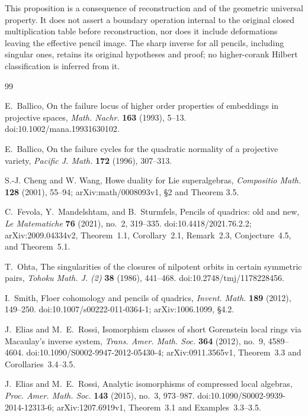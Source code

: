 \documentclass[11pt,reqno]{amsart}
\numberwithin{equation}{section}
\theoremstyle{definition}\newtheorem{definition}[theorem]{Definition}
\theoremstyle{remark}\newtheorem{remark}[theorem]{Remark}
\begin{document}
This proposition is a consequence of reconstruction and of the
geometric universal property. It does not assert a boundary
operation internal to the original closed multiplication table
before reconstruction, nor does it include deformations leaving
the effective pencil image. The sharp inverse for all pencils,
including singular ones, retains its original hypotheses and proof;
no higher-corank Hilbert classification is inferred from it.

\begin{thebibliography}{99}

E.~Ballico,
On the failure locus of higher order properties of embeddings in
projective spaces,
\emph{Math. Nachr.} \textbf{163} (1993), 5--13.
doi:10.1002/mana.19931630102.

E.~Ballico,
On the failure cycles for the quadratic normality of a projective
variety,
\emph{Pacific J. Math.} \textbf{172} (1996), 307--313.

S.-J. Cheng and W. Wang, Howe duality for Lie superalgebras,
\emph{Compositio Math.} \textbf{128} (2001), 55--94;
arXiv:math/0008093v1, \S2 and Theorem 3.5.

C.~Fevola, Y.~Mandelshtam, and B.~Sturmfels,
Pencils of quadrics: old and new,
\emph{Le Matematiche} \textbf{76} (2021), no.~2, 319--335.
doi:10.4418/2021.76.2.2; arXiv:2009.04334v2,
Theorem~1.1, Corollary~2.1, Remark~2.3, Conjecture~4.5, and Theorem~5.1.

T.~Ohta, The singularities of the closures of nilpotent orbits in certain
symmetric pairs, \emph{Tohoku Math. J. (2)} \textbf{38} (1986), 441--468.
doi:10.2748/tmj/1178228456.

I.~Smith, Floer cohomology and pencils of quadrics,
\emph{Invent. Math.} \textbf{189} (2012), 149--250.
doi:10.1007/s00222-011-0364-1; arXiv:1006.1099, \S4.2.

J.~Elias and M.~E.~Rossi,
Isomorphism classes of short Gorenstein local rings via Macaulay's
inverse system,
\emph{Trans. Amer. Math. Soc.} \textbf{364} (2012), no.~9, 4589--4604.
doi:10.1090/S0002-9947-2012-05430-4;
arXiv:0911.3565v1, Theorem~3.3 and Corollaries~3.4--3.5.

J.~Elias and M.~E.~Rossi,
Analytic isomorphisms of compressed local algebras,
\emph{Proc. Amer. Math. Soc.} \textbf{143} (2015), no.~3, 973--987.
doi:10.1090/S0002-9939-2014-12313-6;
arXiv:1207.6919v1, Theorem~3.1 and Examples~3.3--3.5.


\end{thebibliography}
\end{document}
